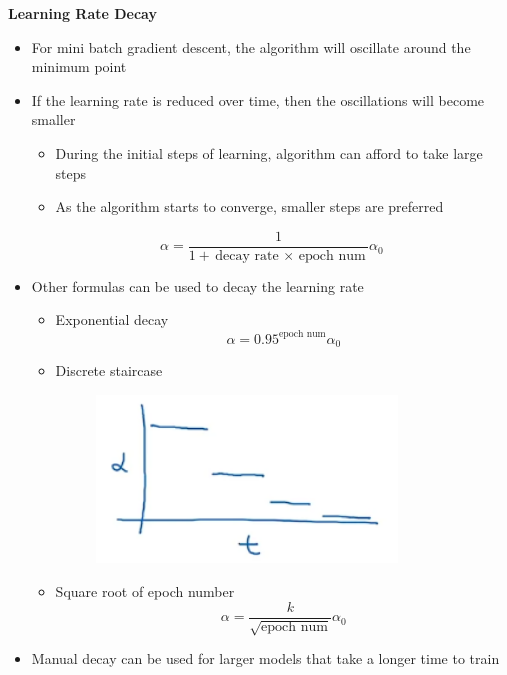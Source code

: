 \documentclass[12pt, letterpaper]{article}
\begin{document}
    \vspace{5mm}
    \textbf{Learning Rate Decay}
    \begin{itemize}
        \item For mini batch gradient descent, the algorithm will oscillate around the minimum point
        \item If the learning rate is reduced over time, then the oscillations will become smaller 
        \begin{itemize}
            \item During the initial steps of learning, algorithm can afford to take large steps
            \item As the algorithm starts to converge, smaller steps are preferred
        \end{itemize}
        $$\alpha=\frac{1}{1+\text{decay rate $\times$ epoch num}}\alpha_0$$
        \item Other formulas can be used to decay the learning rate
        \begin{itemize}
            \item Exponential decay
            $$\alpha=0.95^{\text{epoch num}}\alpha_0$$
            \item Discrete staircase
            \begin{figure}[ht]
                \centering
                \includegraphics[width=8cm]{20.png}
            \end{figure}
            \item Square root of epoch number
            $$\alpha=\frac{k}{\sqrt{\text{epoch num}}}\alpha_0$$            
        \end{itemize}
        \item Manual decay can be used for larger models that take a longer time to train
    \end{itemize}
\end{document}
